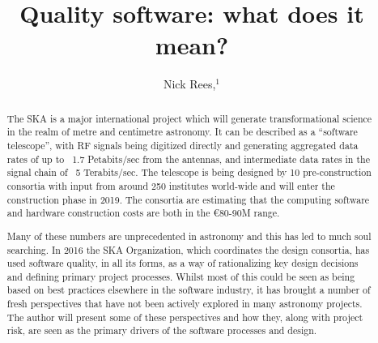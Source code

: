 \documentclass[11pt,twoside]{article}
\begin{document}
\title{Quality software: what does it mean?}

\author{Nick Rees,$^1$
}


\begin{abstract}
The SKA is a major international project which will generate transformational science in the realm of metre and centimetre astronomy. It can be described as a ``software telescope'', with RF signals being digitized directly and generating aggregated data rates of up to ~1.7 Petabits/sec from the antennas, and intermediate data rates in the signal chain of ~5 Terabits/sec. The telescope is being designed by 10 pre-construction consortia with input from around 250 institutes world-wide and will enter the construction phase in 2019. The consortia are estimating that the computing software and hardware construction costs are both in the \euro80-90M range. 

Many of these numbers are unprecedented in astronomy and this has led to much soul searching. In 2016 the SKA Organization, which coordinates the design consortia, has used software quality, in all its forms, as a way of rationalizing key design decisions and defining primary project processes. Whilst most of this could be seen as being based on best practices elsewhere in the software industry, it has brought a number of fresh perspectives that have not been actively explored in many astronomy projects. The author will present some of these perspectives and how they, along with project risk, are seen as the primary drivers of the software processes and design.
\end{abstract}
\end{document}
